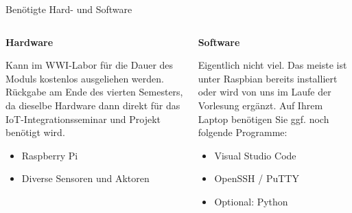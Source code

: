\begin{frame}{Benötigte Hard- und Software}
        \begin{columns}
            \begin{column}[T]{.5\textwidth}
                \textbf{Hardware}
                \medskip

                \parbox{\linewidth}{
                    \footnotesize
                    Kann im WWI-Labor für die Dauer des Moduls kostenlos ausgeliehen
                    werden. Rückgabe am Ende des vierten Semesters, da dieselbe
                    Hardware dann direkt für das IoT-Integrationsseminar und Projekt
                    benötigt wird.
                }
                \medskip

                \begin{itemize}
                    \item Raspberry Pi
                    \item Diverse Sensoren und Aktoren
                \end{itemize}
            \end{column}
            \begin{column}[T]{.5\textwidth}
                \textbf{Software}
                \medskip

                \parbox{\linewidth}{
                    \footnotesize
                    Eigentlich nicht viel. Das meiste ist unter Raspbian bereits
                    installiert oder wird von uns im Laufe der Vorlesung ergänzt.
                    Auf Ihrem Laptop benötigen Sie ggf. noch folgende Programme:
                }
                \medskip

                \begin{itemize}
                    \item Visual Studio Code
                    \item OpenSSH / PuTTY
                    \item Optional: Python
                \end{itemize}
            \end{column}
        \end{columns}
\end{frame}

